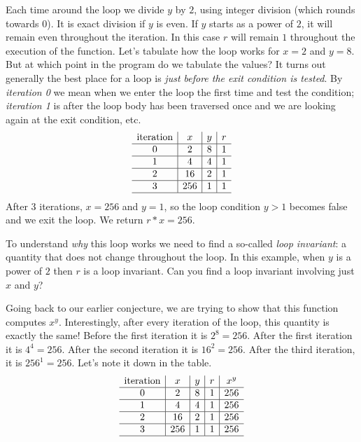 Each time around the loop we divide $y$ by $2$, using integer division
(which rounds towards $0$).  It is exact division if $y$ is even.  If
$y$ starts as a power of $2$, it will remain even throughout the
iteration.  In this case $r$ will remain $1$ throughout the execution
of the function.  Let's tabulate how the loop works for $x = 2$ and $y
= 8$.  But at which point in the program do we tabulate the values?  It
turns out generally the best place for a loop is \emph{just before the
  exit condition is tested}.  By \emph{iteration 0} we mean when we
enter the loop the first time and test the condition; \emph{iteration
  1} is after the loop body has been traversed once and we are looking
again at the exit condition, etc.
\[
\begin{array}{c|c|c|c}
  \mbox{iteration} & x & y & r \\ \hline
  0 & 2 & 8 & 1 \\ \hline
  1 & 4 & 4 & 1 \\ \hline
  2 & 16 & 2 & 1 \\ \hline
  3 & 256 & 1 & 1 \\ \hline
\end{array}
\]
After 3 iterations, $x = 256$ and $y = 1$, so the loop condition
$y > 1$ becomes false and we exit the loop.  We return $r * x =
256$.

To understand \emph{why} this loop works we need to find a so-called
\emph{loop invariant}: a quantity that does not change throughout the
loop.  In this example, when $y$ is a power of $2$ then $r$ is a loop
invariant.  Can you find a loop invariant involving just $x$ and $y$?

\clearpage
Going back to our earlier conjecture, we are trying to show that this
function computes $x^y$.  Interestingly, after every iteration of
the loop, this quantity is exactly the same!  Before the first iteration
it is $2^8 = 256$.  After the first iteration it is $4^4 = 256$.
After the second iteration it is $16^2 = 256$.  After the third iteration,
it is $256^1 = 256$.  Let's note it down in the table.
$$
\begin{array}{c|c|c|c|c}
  \mbox{iteration} & x & y & r & x^y \\ \hline
  0 & 2 & 8 & 1 & 256\\ \hline
  1 & 4 & 4 & 1 & 256 \\ \hline
  2 & 16 & 2 & 1 & 256 \\ \hline
  3 & 256 & 1 & 1 & 256 \\ \hline
\end{array}
$$

